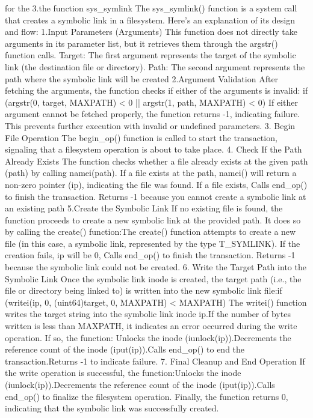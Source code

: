 \documentclass{article}
\begin{document}
for the 3.the function sys_symlink
The sys_symlink() function is a system call that creates a symbolic link in a filesystem. Here's an explanation of its design and flow:
1.Input Parameters (Arguments)
This function does not directly take arguments in its parameter list, but it retrieves them through the argstr() function calls.
Target: The first argument represents the target of the symbolic link (the destination file or directory).
Path: The second argument represents the path where the symbolic link will be created
2.Argument Validation
After fetching the arguments, the function checks if either of the arguments is invalid:
if (argstr(0, target, MAXPATH) < 0 || argstr(1, path, MAXPATH) < 0)
If either argument cannot be fetched properly, the function returns -1, indicating failure. This prevents further execution with invalid or undefined parameters.
3. Begin File Operation
The begin_op() function is called to start the transaction, signaling that a filesystem operation is about to take place.
4. Check If the Path Already Exists
The function checks whether a file already exists at the given path (path) by calling namei(path).
If a file exists at the path, namei() will return a non-zero pointer (ip), indicating the file was found. If a file exists, Calls end_op() to finish the transaction. Returns -1 because you cannot create a symbolic link at an existing path 
5.Create the Symbolic Link
If no existing file is found, the function proceeds to create a new symbolic link at the provided path. It does so by calling the create() function:The create() function attempts to create a new file (in this case, a symbolic link, represented by the type T_SYMLINK).
If the creation fails, ip will be 0, Calls end_op() to finish the transaction. Returns -1 because the symbolic link could not be created.
6. Write the Target Path into the Symbolic Link
Once the symbolic link inode is created, the target path (i.e., the file or directory being linked to) is written into the new symbolic link file:if (writei(ip, 0, (uint64)target, 0, MAXPATH) < MAXPATH)
The writei() function writes the target string into the symbolic link inode ip.If the number of bytes written is less than MAXPATH, it indicates an error occurred during the write operation. If so, the function:
Unlocks the inode (iunlock(ip)).Decrements the reference count of the inode (iput(ip)).Calls end_op() to end the transaction.Returns -1 to indicate failure.
7. Final Cleanup and End Operation
If the write operation is successful, the function:Unlocks the inode (iunlock(ip)).Decrements the reference count of the inode (iput(ip)).Calls end_op() to finalize the filesystem operation.
Finally, the function returns 0, indicating that the symbolic link was successfully created.
\end{document}
